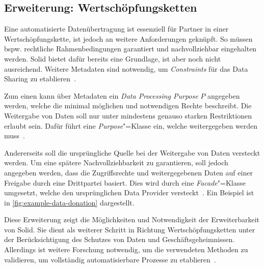 \subsection{Erweiterung: Wertschöpfungsketten}

Eine automatisierte Datenübertragung ist essenziell für Partner in einer Wertschöpfungskette, ist jedoch an weitere Anforderungen geknüpft.
So müssen bspw. rechtliche Rahmenbedingungen garantiert und nachvollziehbar eingehalten werden.
Solid bietet dafür bereits eine Grundlage, ist aber noch nicht ausreichend.
Weitere Metadaten sind notwendig, um \emph{Constraints} für das Data Sharing zu etablieren~\cite{bothSolidBasedB2BData2025}.

Zum einen kann über Metadaten ein \emph{Data Processing Purpose} $P$ angegeben werden, welche die minimal möglichen und notwendigen Rechte beschreibt.
Die Weitergabe von Daten soll nur unter mindestens genauso starken Restriktionen erlaubt sein.
Dafür führt \cite{bothSolidBasedB2BData2025} eine \emph{Purpose}"=Klasse ein, welche weitergegeben werden muss~\cite{bothSolidBasedB2BData2025}.

Andererseits soll die ursprüngliche Quelle bei der Weitergabe von Daten versteckt werden.
Um eine spätere Nachvollziehbarkeit zu garantieren, soll jedoch angegeben werden, dass die Zugriffsrechte und weitergegebenen Daten auf einer Freigabe durch eine Drittpartei basiert.
Dies wird durch eine \emph{Facade}"=Klasse umgesetzt, welche den ursprünglichen Data Provider versteckt~\cite{bothSolidBasedB2BData2025}. Ein Beispiel ist in \autoref{fig:example-data-donation} dargestellt.

Diese Erweiterung zeigt die Möglichkeiten und Notwendigkeit der Erweiterbarkeit von Solid.
Sie dient als weiterer Schritt in Richtung Wertschöpfungsketten unter der Berücksichtigung des Schutzes von Daten und Geschäftsgeheimnissen.
Allerdings ist weitere Forschung notwendig, um die verwendeten Methoden zu validieren, um vollständig automatisierbare Prozesse zu etablieren~\cite{bothSolidBasedB2BData2025}.
